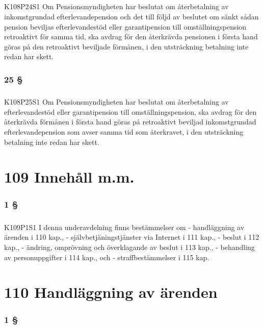 \documentclass[a4paper,notitlepage,openany,10pt]{book}
\begin{document}
\paragraph*{}
{\tiny K108P24S1}
Om Pensionsmyndigheten har beslutat om återbetalning av inkomstgrundad efterlevandepension och det till följd av beslutet om sänkt sådan pension beviljas efterlevandestöd eller garantipension till omställningspension retroaktivt för samma tid, ska avdrag för den återkrävda pensionen i första hand göras på den retroaktivt beviljade förmånen, i den utsträckning betalning inte redan har skett.
\subsection*{25 §}
\paragraph*{}
{\tiny K108P25S1}
Om Pensionsmyndigheten har beslutat om återbetalning av efterlevandestöd eller garantipension till omställningspension, ska avdrag för den återkrävda förmånen i första hand göras på retroaktivt beviljad inkomstgrundad efterlevandepension som avser samma tid som återkravet, i den utsträckning betalning inte redan har skett.
\chapter*{109 Innehåll m.m.}
\subsection*{1 §}
\paragraph*{}
{\tiny K109P1S1}
I denna underavdelning finns bestämmelser om
\newline - handläggning av ärenden i 110 kap., - självbetjäningstjänster via Internet i 111 kap.,
\newline - beslut i 112 kap.,
\newline - ändring, omprövning och överklagande av beslut i 113 kap.,
\newline - behandling av personuppgifter i 114 kap., och
\newline - straffbestämmelser i 115 kap.
\chapter*{110 Handläggning av ärenden}
\subsection*{1 §}
\end{document}
